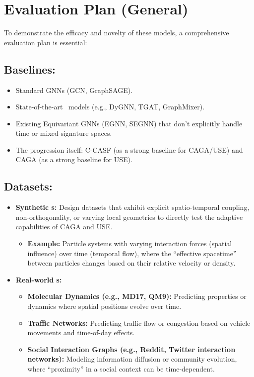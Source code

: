 \documentclass[11pt]{article}
\newcommand{\STG}{\text{CTDSTG}} %
\begin{document}
\section{Evaluation Plan (General)}
To demonstrate the efficacy and novelty of these models, a comprehensive evaluation plan is essential:

\subsection{Baselines:}
\begin{itemize}[noitemsep]
    \item Standard GNNs (GCN, GraphSAGE).
    \item State-of-the-art \STG \ models (e.g., DyGNN, TGAT, GraphMixer).
    \item Existing Equivariant GNNs (EGNN, SEGNN) that don't explicitly handle time or mixed-signature spaces.
    \item The progression itself: C-CASF (as a strong baseline for CAGA/USE) and CAGA (as a strong baseline for USE).
\end{itemize}

\subsection{Datasets:}
\begin{itemize}[noitemsep]
    \item \textbf{Synthetic \STG s:} Design datasets that exhibit explicit spatio-temporal coupling, non-orthogonality, or varying local geometries to directly test the adaptive capabilities of CAGA and USE.
        \begin{itemize}[noitemsep]
            \item \textbf{Example:} Particle systems with varying interaction forces (spatial influence) over time (temporal flow), where the ``effective spacetime'' between particles changes based on their relative velocity or density.
        \end{itemize}
    \item \textbf{Real-world \STG s:}
    \begin{itemize}[noitemsep]
        \item \textbf{Molecular Dynamics (e.g., MD17, QM9):} Predicting properties or dynamics where spatial positions evolve over time.
        \item \textbf{Traffic Networks:} Predicting traffic flow or congestion based on vehicle movements and time-of-day effects.
        \item \textbf{Social Interaction Graphs (e.g., Reddit, Twitter interaction networks):} Modeling information diffusion or community evolution, where ``proximity'' in a social context can be time-dependent.
    \end{itemize}
\end{itemize}
\end{document}
